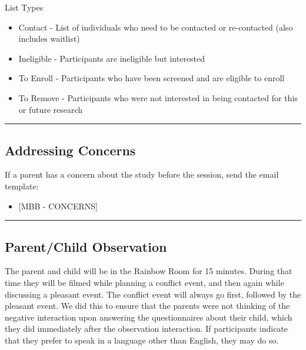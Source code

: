 \documentclass[]{book}
\providecommand{\tightlist}{%
  \setlength{\itemsep}{0pt}\setlength{\parskip}{0pt}}
\begin{document}
List Types

\begin{itemize}
\tightlist
\item
  Contact - List of individuals who need to be contacted or re-contacted (also includes waitlist)
\item
  Ineligible - Participants are ineligible but interested
\item
  To Enroll - Participants who have been screened and are eligible to enroll
\item
  To Remove - Participants who were not interested in being contacted for this or future research
\end{itemize}

\begin{center}\rule{0.5\linewidth}{0.5pt}\end{center}

\hypertarget{addressing-concerns}{%
\subsection{Addressing Concerns}\label{addressing-concerns}}

If a parent has a concern about the study before the session, send the email template:

\begin{itemize}
\tightlist
\item
  {[}MBB - CONCERNS{]}
\end{itemize}

\begin{center}\rule{0.5\linewidth}{0.5pt}\end{center}

\hypertarget{parentchild-observation}{%
\subsection{Parent/Child Observation}\label{parentchild-observation}}

The parent and child will be in the Rainbow Room for 15 minutes. During that time they will be filmed while planning a conflict event, and then again while discussing a pleasant event. The conflict event will always go first, followed by the pleasant event. We did this to ensure that the parents were not thinking of the negative interaction upon answering the questionnaires about their child, which they did immediately after the observation interaction. If participants indicate that they prefer to speak in a language other than English, they may do so.
\end{document}
